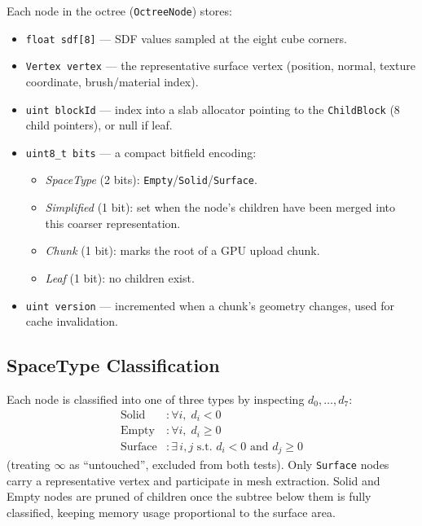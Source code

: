 \documentclass[10pt,a4paper]{article}
\begin{document}
Each node in the octree (\lstinline{OctreeNode}) stores:
\begin{itemize}[leftmargin=2em]
  \item \lstinline{float sdf[8]} — SDF values sampled at the eight cube corners.
  \item \lstinline{Vertex vertex} — the representative surface vertex
    (position, normal, texture coordinate, brush/material index).
  \item \lstinline{uint blockId} — index into a slab allocator pointing
    to the \lstinline{ChildBlock} (8 child pointers), or null if leaf.
  \item \lstinline{uint8_t bits} — a compact bitfield encoding:
    \begin{itemize}
      \item \emph{SpaceType} (2 bits): \lstinline{Empty}/\lstinline{Solid}/\lstinline{Surface}.
      \item \emph{Simplified} (1 bit): set when the node's children have been
        merged into this coarser representation.
      \item \emph{Chunk} (1 bit): marks the root of a GPU upload chunk.
      \item \emph{Leaf} (1 bit): no children exist.
    \end{itemize}
  \item \lstinline{uint version} — incremented when a chunk's geometry
    changes, used for cache invalidation.
\end{itemize}

\subsection{SpaceType Classification}
\label{sec:octree:spacetype}

Each node is classified into one of three types by inspecting
$d_0,\ldots,d_7$:
\begin{align*}
  \text{Solid}   &: \forall i,\; d_i < 0\phantom{\text{ and }\exists j} \\
  \text{Empty}   &: \forall i,\; d_i \geq 0\\
  \text{Surface} &: \exists\, i,j \text{ s.t.\ } d_i < 0 \text{ and } d_j \geq 0
\end{align*}
(treating $\infty$ as ``untouched'', excluded from both tests).
Only \lstinline{Surface} nodes carry a representative vertex and
participate in mesh extraction.  Solid and Empty nodes are pruned of
children once the subtree below them is fully classified, keeping memory
usage proportional to the surface area.
\end{document}
